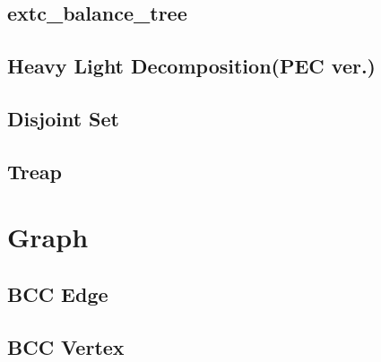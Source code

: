 \documentclass[a4paper,10pt,twocolumn,oneside]{article}
\begin{document}
\subsection{extc\_balance\_tree}


\subsection{Heavy Light Decomposition(PEC ver.)}


\subsection{Disjoint Set}


\subsection{Treap}


%

%

\section{Graph}

\subsection{BCC Edge}


\subsection{BCC Vertex}

\end{document}
